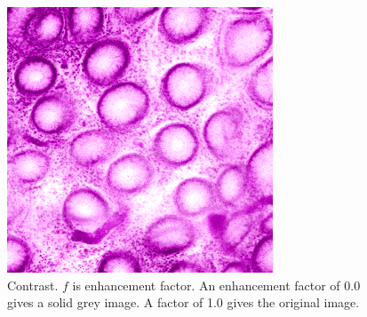 \begin{figure}[H]
\begin{minipage}{0.25\columnwidth}
	\end{minipage}
	\begin{minipage}{0.25\columnwidth}
		\centering
		\includegraphics[clip, width=\linewidth]{fig/preprocessing/data_aug/color/CONTRAST/CONTRAST_1_50}
	\end{minipage}	
	
	\caption{Contrast. $f$ is enhancement factor. An enhancement factor of 0.0 gives a solid grey image. A factor of 1.0 gives the original image.}
	\label{fig:}
	
\end{figure}

